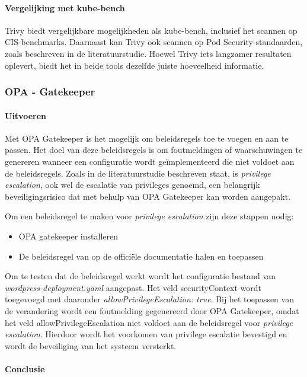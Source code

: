 \paragraph{Vergelijking met kube-bench}
Trivy biedt vergelijkbare mogelijkheden als kube-bench, inclusief het scannen op CIS-benchmarks. Daarnaast kan Trivy ook scannen op Pod Security-standaarden, zoals beschreven in de literatuurstudie. Hoewel Trivy iets langzamer resultaten oplevert, biedt het in beide tools dezelfde juiste hoeveelheid informatie.


\subsubsection{OPA - Gatekeeper}

\paragraph{Uitvoeren}


Met OPA Gatekeeper is het mogelijk om beleidsregels toe te voegen en aan te passen. Het doel van deze beleidsregels is om foutmeldingen of waarschuwingen te genereren wanneer een configuratie wordt geïmplementeerd die niet voldoet aan de beleidsregels. Zoals in de literatuurstudie beschreven staat, is \textit{privilege escalation}, ook wel de escalatie van privileges genoemd, een belangrijk beveiligingsrisico dat met behulp van OPA Gatekeeper kan worden aangepakt. 


Om een beleidsregel te maken voor \textit{privilege escalation} zijn deze stappen nodig:
\begin{itemize}
    \item OPA gatekeeper installeren
    \item De beleidsregel van op de officiële documentatie halen en toepassen
\end{itemize}

Om te testen dat de beleidsregel werkt wordt het configuratie bestand van \textit{wordpress-deployment.yaml} aangepast. Het veld securityContext wordt toegevoegd met daaronder \textit{allowPrivilegeEscalation: true}. Bij het toepassen van de verandering wordt een foutmelding gegenereerd door OPA Gatekeeper, omdat het veld allowPrivilegeEscalation niet voldoet aan de beleidsregel voor \textit{privilege escalation}. Hierdoor wordt het voorkomen van privilege escalatie bevestigd en wordt de beveiliging van het systeem versterkt.

\paragraph{Conclusie}

